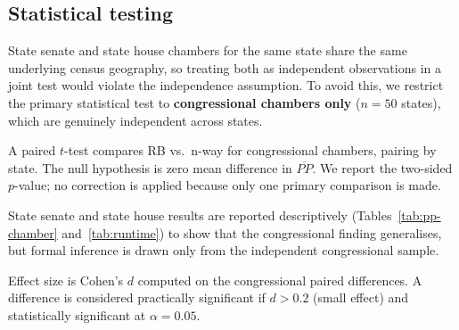 \subsection{Statistical testing}

State senate and state house chambers for the same state share the same
underlying census geography, so treating both as independent observations
in a joint test would violate the independence assumption.
To avoid this, we restrict the primary statistical test to
\textbf{congressional chambers only} ($n = 50$ states), which are
genuinely independent across states.

A paired $t$-test compares RB vs.\ n-way for congressional chambers,
pairing by state.  The null hypothesis is zero mean difference in
$\overline{PP}$.  We report the two-sided $p$-value; no correction is
applied because only one primary comparison is made.

State senate and state house results are reported descriptively
(Tables~\ref{tab:pp-chamber} and~\ref{tab:runtime}) to show that the
congressional finding generalises, but formal inference is drawn only
from the independent congressional sample.

Effect size is Cohen's $d$ computed on the congressional paired differences.
A difference is considered practically significant if $d > 0.2$ (small
effect) and statistically significant at $\alpha = 0.05$.
